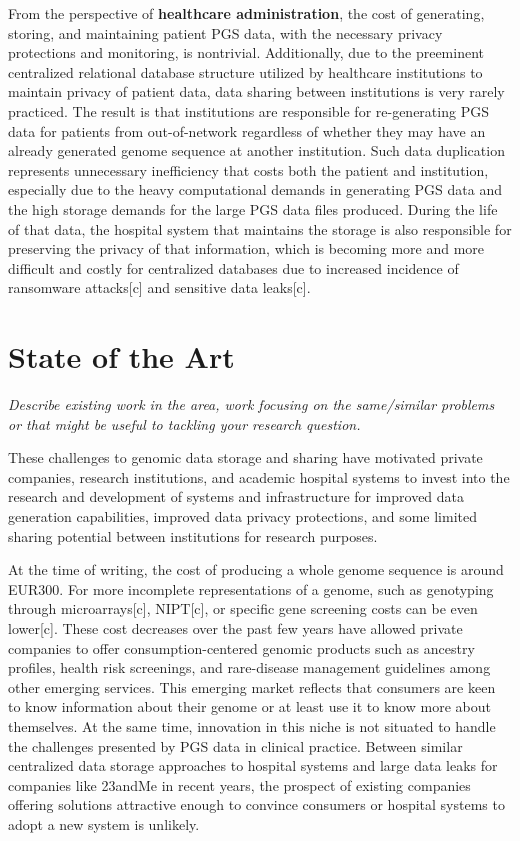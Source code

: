 \documentclass{article}
\begin{document}
From the perspective of \textbf{healthcare administration}, the cost of generating, storing, and maintaining patient PGS data, with the necessary privacy protections and monitoring, is nontrivial. Additionally, due to the preeminent centralized relational database structure utilized by healthcare institutions to maintain privacy of patient data, data sharing between institutions is very rarely practiced. The result is that institutions are responsible for re-generating PGS data for patients from out-of-network regardless of whether they may have an already generated genome sequence at another institution. Such data duplication represents unnecessary inefficiency that costs both the patient and institution, especially due to the heavy computational demands in generating PGS data and the high storage demands for the large PGS data files produced. During the life of that data, the hospital system that maintains the storage is also responsible for preserving the privacy of that information, which is becoming more and more difficult and costly for centralized databases due to increased incidence of ransomware attacks[c] and sensitive data leaks[c]. 


\section{State of the Art}
\textit{Describe existing work in the area, work focusing on the same/similar problems or that might be useful to tackling your research question.}

These challenges to genomic data storage and sharing have motivated private companies, research institutions, and academic hospital systems to invest into the research and development of systems and infrastructure for improved data generation capabilities, improved data privacy protections, and some limited sharing potential between institutions for research purposes. 

At the time of writing, the cost of producing a whole genome sequence is around EUR300. For more incomplete representations of a genome, such as genotyping through microarrays[c], NIPT[c], or specific gene screening costs can be even lower[c]. These cost decreases over the past few years have allowed private companies to offer consumption-centered genomic products such as ancestry profiles, health risk screenings, and rare-disease management guidelines among other emerging services. This emerging market reflects that consumers are keen to know information about their genome or at least use it to know more about themselves. At the same time, innovation in this niche is not situated to handle the challenges presented by PGS data in clinical practice. Between similar centralized data storage approaches to hospital systems and large data leaks for companies like 23andMe in recent years, the prospect of existing companies offering solutions attractive enough to convince consumers or hospital systems to adopt a new system is unlikely. 
\end{document}
